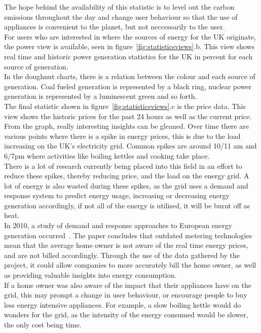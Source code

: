 \documentclass[draft,preprint,12pt,3p]{elsarticle}
\begin{document}
The hope behind the availability of this statistic is to level out the carbon emissions throughout the day and change user behaviour so that the use of appliances is convenient to the planet, but not neccessarily to the user.\\
For users who are interested in where the sources of energy for the UK originate, the power view is available, seen in figure~\ref{fig:statisticsviews}.b. This view shows real time and historic power generation statistics for the UK in percent for each source of generation.\\
In the doughnut charts, there is a relation between the colour and each source of generation. Coal fueled generation is represented by a black ring, nuclear power generation is represented by a luminescent green and so forth.\\
The final statistic shown in figure~\ref{fig:statisticsviews}.c is the price data. This view shows the historic prices for the past 24 hours as well as the current price.\\
From the graph, really interesting insights can be gleaned. Over time there are various points where there is a spike in energy prices, this is due to the load increasing on the UK's electricity grid. Common spikes are around 10/11 am and 6/7pm where activities like boiling kettles and cooking take place.\\
There is a lot of research currently being placed into this field in an effort to reduce these spikes, thereby reducing price, and the load on the energy grid. A lot of energy is also wasted during these spikes, as the grid uses a demand and response system to predict energy usage, increasing or decreasing energy generation accordingly, if not all of the energy is utilised, it will be burnt off as heat.\\
In 2010, a study of demand and response approaches to European energy generation occurred~\cite{demandresponse}. The paper concludes that outdated metering technologies mean that the average home owner  is not aware of the real time energy prices, and are not billed accordingly. Through the use of the data gathered by the project, it could allow companies to more accurately bill the home owner, as well as providing valuable insights into energy consumption.\\
If a home owner was also aware of the impact that their appliances have on the grid, this may prompt a change in user behaviour, or encourage people to buy less energy intensive appliances. For example, a slow boiling kettle would do wonders for the grid, as the intensity of the energy consumed would be slower, the only cost being time.
\end{document}

